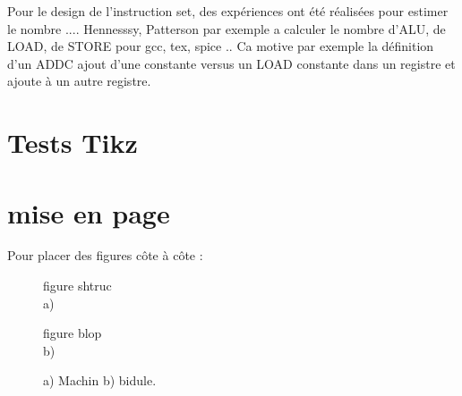 Pour le design de l'instruction set, des expériences ont été réalisées pour estimer le nombre .... Hennesssy, Patterson par exemple a calculer le nombre d'ALU, de LOAD, de STORE pour gcc, tex, spice .. Ca motive par exemple la définition d'un ADDC ajout d'une constante versus un LOAD constante dans un registre et ajoute à un autre registre.



\section{Tests Tikz}


\section{mise en page}

Pour placer des figures côte à côte :

\begin{figure}
   \begin{minipage}[c]{.46\linewidth}
figure shtruc \\\centering a)
   \end{minipage} \hfill
   \begin{minipage}[c]{.46\linewidth}
figure blop\\\centering b)
   \end{minipage}
\caption{ a) Machin b) bidule.}
\end{figure}

